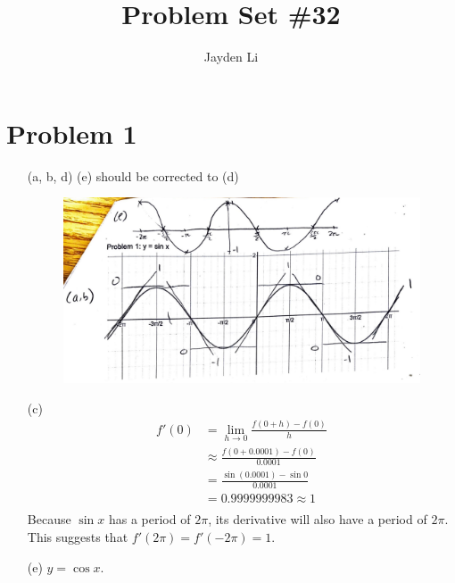\documentclass{article}
\title{Problem Set \#32}
\author{Jayden Li}
\begin{document}
\maketitle

\linespread{1.25}
\fontsize{12pt}{12pt}\selectfont

\section*{Problem 1}
\begin{itemize}

\item[(a, b, d)]
(e) should be corrected to (d)
\begin{figure}[h]
    \centering
    \includegraphics[width=.8\linewidth]{ps32q1abd.png}
\end{figure}

\item[(c)]
    \begin{align*}
        f'\left(0\right)&=\lim\limits_{h\to0}\frac{f\left(0+h\right)-f\left(0\right)}{h} \\
        &\approx\frac{f\left(0+0.0001\right)-f(0)}{0.0001} \\
        &=\frac{\sin(0.0001)-\sin0}{0.0001} \\
        &=0.9999999983\approx1\\
    \end{align*}
    Because $\sin x$ has a period of $2\pi$, its derivative will also have a period of $2\pi$. This suggests that $f'\left(2\pi\right)=f'\left(-2\pi\right)=1$.

\item[(e)]
    $y=\cos x$.

\end{itemize}
\end{document}
